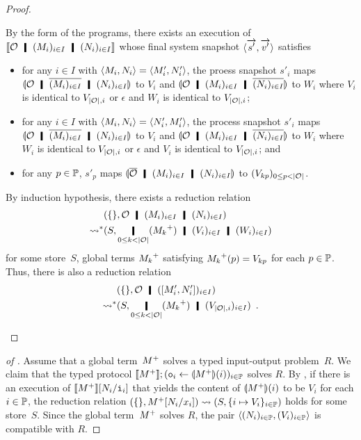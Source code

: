 \begin{proof}
\begin{description}
	  By the form of the programs, there exists an execution of
	  $\semo{\hypert\hmid (M_i)_{i\in I}\hmid (N_i)_{i\in I}}$
	  whose final system snapshot $\langle{\overrightarrow{s'}, \overrightarrow{v'}}\rangle$
	  satisfies
	  \begin{itemize}
	   \item for any $i\in I$ with $\langle{M_i,N_i}\rangle = \langle{M'_i,
		 N'_i}\rangle$, the proess snapshot
		 $s'_i$ maps
		 $\semoi{\hypert\hmid \overline{(M_i)_{i\in I}}\hmid
		 (N_i)_{i\in I}}$ to $V_i$ and
		 $\semoi{\hypert\hmid (M_i)_{i\in I}\hmid
		 \overline{(N_i)_{i\in I}}}$ to $W_i$ where
		 $V_i$ is identical to $V_{|\mathcal{O}|,i}$ or
		 $\epsilon$ and $W_i$ is identical to
		 $V_{|\mathcal{O}|,i}$;
	   \item
		 for any $i\in I$ with $\langle{M_i,N_i}\rangle = \langle{N'_i,
		 M'_i}\rangle$, the process snapshot
		 $s'_i$ maps
		 $\semoi{\hypert\hmid \overline{(M_i)_{i\in I}}\hmid
		 (N_i)_{i\in I}}$ to $V_i$ and
		 $\semoi{\hypert\hmid (M_i)_{i\in I}\hmid
		 \overline{(N_i)_{i\in I}}}$ to $W_i$ where
		 $W_i$ is identical to $V_{|\mathcal{O}|,i}$ or
		 $\epsilon$ and $V_i$ is identical to
		 $V_{|\mathcal{O}|,i}$; and
	   \item for any $p\in\mathbb{P}$,
		 $s'_p$ maps $\semoi{\overline{\hypert}\hmid (M_i)_{i\in
		 I}\hmid (N_i)_{i\in I}}$ to
		 $(V_{kp})_{0\le p < |\mathcal{O}|}$.
	  \end{itemize}
	  By induction hypothesis, there exists a reduction relation
	  \begin{align*}
	   &\concreteconf{\{\}}{\hypert\hmid (M_i)_{i\in I}\hmid
	   (N_i)_{i\in I}}
	   \\
	   \reduction&\concreteconf{S}{\operatorname*{\hmid}_{0\le k <
	   |\hypert|}
	   (\m{M_k})\hmid (V_i)_{i\in I}\hmid (W_i)_{i\in I}}
	  \end{align*}
	  for some store~$S$, global terms ${M_k}^+$ satisfying
	  ${M_k}^+(p) = V_{kp}$ for each $p\in \mathbb{P}$.
	  Thus, there is also a reduction relation
	  \begin{align*}
	   &\concreteconf{\{\}}{\hypert\hmid (\cotuple{M'_i,N'_i})_{i\in
	   I}}
	   \\
	   \reduction&\concreteconf{S}{\operatorname*{\hmid}_{0\le k <
	   |\hypert|}(\m{M_k})\hmid (V_{|\hypert|,i})_{i\in I}}\enspace.
	  \end{align*}
    \end{description}
   \end{proof}

 \begin{proof}[of ]
  Assume that a global term~${M}^+$ solves a typed input-output problem~$R$.
  We claim that the typed protocol
  $\llbracket{{M}^+}\rrbracket; (\texttt{o}_i\leftarrow \llparenthesis{{M}^+}\rrparenthesis(i))_{i\in \mathbb{P}}$
  solves $R$.
  By ,
  if there is an execution of $\llbracket{{M}^+}\rrbracket[N_i / \texttt{i}_i]$ that yields
  the content of $\llparenthesis{{M}^+}\rrparenthesis(i)$ to be $V_i$ for each $i\in
  \mathbb{P}$,
  the reduction relation $({\{\}},{{M}^+[N_i/x_i]})\rightsquigarrow
  ({S},{\{i\mapsto V_i\}_{i\in \mathbb{P}}})$ holds for some
  store~$S$.
  Since the global term~${M}^+$ solves $R$, the pair
  $\langle{(N_i)_{i\in \mathbb{P}}, (V_i)_{i\in\mathbb{P}}}\rangle$ is compatible
  with $R$.
 \end{proof}

